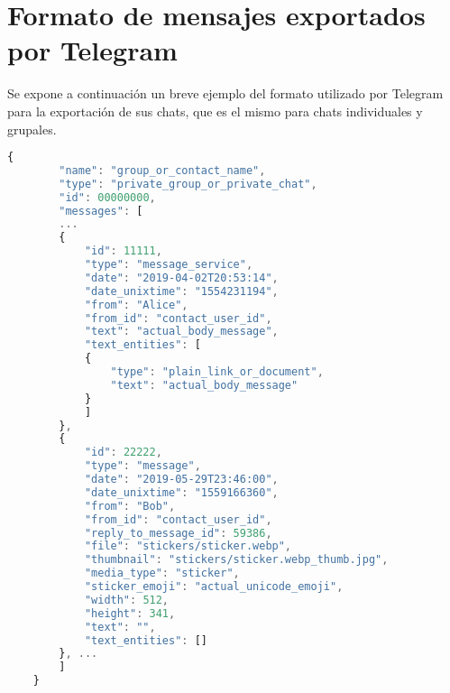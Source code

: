 \chapter{Formato de mensajes exportados por Telegram}
\label{chap:telegram_json}

Se expone a continuación un breve ejemplo del formato utilizado por Telegram para la exportación de sus chats, que es el mismo para chats individuales y grupales.

\begin{lstlisting}[language=JavaScript]
	{
		"name": "group_or_contact_name",
		"type": "private_group_or_private_chat",
		"id": 00000000,
		"messages": [
		...
		{
			"id": 11111,
			"type": "message_service",
			"date": "2019-04-02T20:53:14",
			"date_unixtime": "1554231194",
			"from": "Alice",
			"from_id": "contact_user_id",
			"text": "actual_body_message",
			"text_entities": [
			{
				"type": "plain_link_or_document",
				"text": "actual_body_message"
			}
			]
		},
		{
			"id": 22222,
			"type": "message",
			"date": "2019-05-29T23:46:00",
			"date_unixtime": "1559166360",
			"from": "Bob",
			"from_id": "contact_user_id",
			"reply_to_message_id": 59386,
			"file": "stickers/sticker.webp",
			"thumbnail": "stickers/sticker.webp_thumb.jpg",
			"media_type": "sticker",
			"sticker_emoji": "actual_unicode_emoji",
			"width": 512,
			"height": 341,
			"text": "",
			"text_entities": []
		}, ...
		]
	}
\end{lstlisting}